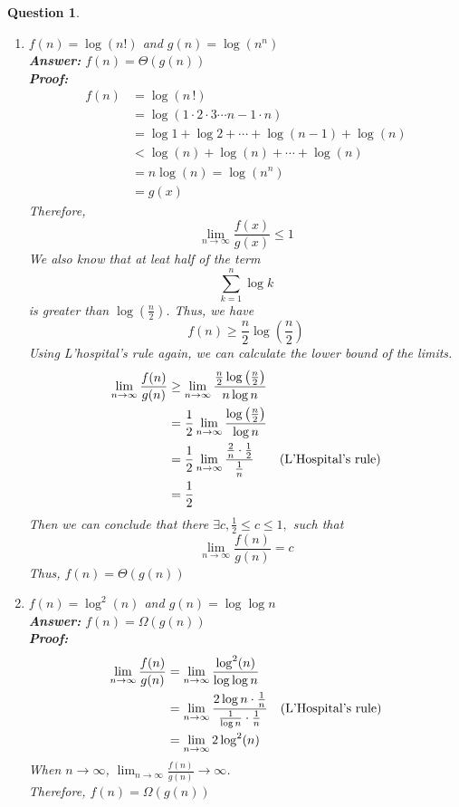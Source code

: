 \documentclass[10.5pt]{article}
\newcommand{\liminfty}{\lim_{n\to\infty}}
\newtheorem{Q}{Question}
\begin{document}
\begin{Q}
\begin{enumerate}
		\textup{When }$n\to\infty$, $\frac{f(n)}{g(n)}\to\infty$.\\
		\textup{Therefore, } $f(n) = \Omega(g(n))$\\
		\\
    \item $f(n) = \log(n!)$ and $g(n) = \log(n^n)$\\
		\textup{\textbf{Answer: }}$f(n) = \Theta(g(n))$ \\
		\textup{\textbf{Proof: }}\\
		\begin{align*}
			f(n) &= \log(n\, !)\\
			&=\log(1 \cdot 2\cdot 3 \cdots n-1 \cdot n)\\
			&=\log1 + \log2 +\cdots +\log(n-1 ) + \log(n) \\
			&< \log(n) + \log(n) +\cdots+\log (n)\\
			&= n\log(n) = \log(n^n)\\
			&= g(x)
		\end{align*}
		\textup{Therefore, }
		$$\liminfty \frac{f(x)}{g(x)} \le 1$$
		\textup{We also know that at leat half of the term}  
		$$\sum_{k = 1}^{n}\log k$$
		\textup{is greater than }$\log\left(\frac{n}2\right)$\textup{. Thus, we have}
		$$
		f(n) \ge \frac{n}{2}\log\left(\frac n 2\right)
		$$
		\textup{Using L'hospital's rule again, we can calculate the lower bound of the limits.}
		\begin{align*}
			\liminfty\frac{f(n)}{g(n)} &\ge \liminfty\frac{\frac n 2\log\left(\frac n 2\right)}{n\log n}&\\
			& =\frac 1 2 \liminfty\frac{\log\left(\frac n2\right)}{\log n}&\\
			&=\frac 1 2\liminfty\frac{\frac 2n\cdot\frac12}{\frac1n}&\textup{(L'Hospital's rule)}\\
			&=\frac12&
		\end{align*}
		\textup{Then we can conclude that there} $\exists c, \frac12 \le c\le 1,$\textup{ such that}
		$$\liminfty\frac{f(n)}{g(n)} = c$$
		\textup{Thus, }$f(n) = \Theta(g(n))$
    \item $f(n) = {\log}^2(n)$ and $g(n) = \log \log n$\\
		\textup{\textbf{Answer: }}$f(n) = \Omega(g(n))$ \\
		\textup{\textbf{Proof: }}\\
		\begin{align*}
			\liminfty \frac{f(n)}{g(n)} &= \liminfty\frac{\log^2(n)}{\log\log n}&\\
			&=\liminfty \frac{2\log n\cdot\frac 1n}{\frac1{\log n}\cdot\frac1n}&\textup{(L'Hospital's rule)}\\
			&=\liminfty2\log^2(n)
		\end{align*}
		\textup{When }$n\to\infty$, $\liminfty\frac{f(n)}{g(n)}\to\infty$\textup{.}\\
		\textup{Therefore, }$f(n) = \Omega(g(n))$
\end{enumerate}
\end{Q}
\pagebreak
\end{document}
